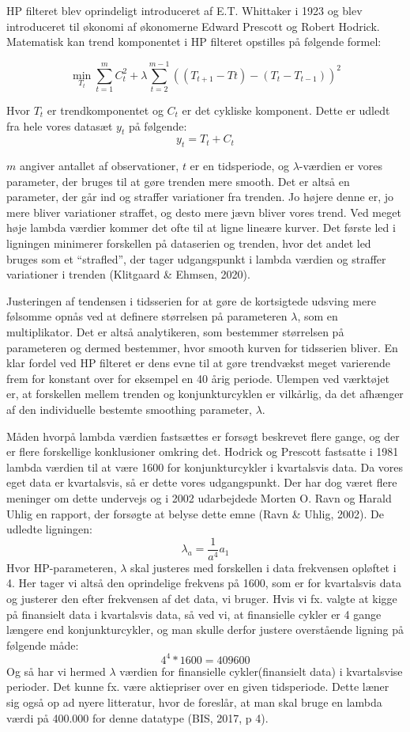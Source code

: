\documentclass[
  10pt,
]{article}
\begin{document}
HP filteret blev oprindeligt introduceret af E.T. Whittaker i 1923 og
blev introduceret til økonomi af økonomerne Edward Prescott og Robert
Hodrick. Matematisk kan trend komponentet i HP filteret opstilles på
følgende formel:

\[ \min_{T_t}\sum_{t=1}^m C_t^2+\lambda\sum_{t=2}^{m-1}((T_{t+1}-Tt)-(T_t-T_{t-1}))^2\]

Hvor \(T_t\) er trendkomponentet og \(C_t\) er det cykliske komponent.
Dette er udledt fra hele vores datasæt \(y_t\) på følgende:
\[ y_t=T_t+C_t\]

\(m\) angiver antallet af observationer, \(t\) er en tidsperiode, og
\(\lambda\)-værdien er vores parameter, der bruges til at gøre trenden
mere smooth. Det er altså en parameter, der går ind og straffer
variationer fra trenden. Jo højere denne er, jo mere bliver variationer
straffet, og desto mere jævn bliver vores trend. Ved meget høje lambda
værdier kommer det ofte til at ligne lineære kurver. Det første led i
ligningen minimerer forskellen på dataserien og trenden, hvor det andet
led bruges som et ``strafled'', der tager udgangspunkt i lambda værdien
og straffer variationer i trenden (Klitgaard \& Ehmsen, 2020).

Justeringen af tendensen i tidsserien for at gøre de kortsigtede udsving
mere følsomme opnås ved at definere størrelsen på parameteren
\(\lambda\), som en multiplikator. Det er altså analytikeren, som
bestemmer størrelsen på parameteren og dermed bestemmer, hvor smooth
kurven for tidsserien bliver. En klar fordel ved HP filteret er dens
evne til at gøre trendvækst meget varierende frem for konstant over for
eksempel en 40 årig periode. Ulempen ved værktøjet er, at forskellen
mellem trenden og konjunkturcyklen er vilkårlig, da det afhænger af den
individuelle bestemte smoothing parameter, \(\lambda\).

Måden hvorpå lambda værdien fastsættes er forsøgt beskrevet flere gange,
og der er flere forskellige konklusioner omkring det. Hodrick og
Prescott fastsatte i 1981 lambda værdien til at være 1600 for
konjunkturcykler i kvartalsvis data. Da vores eget data er kvartalsvis,
så er dette vores udgangspunkt. Der har dog været flere meninger om
dette undervejs og i 2002 udarbejdede Morten O. Ravn og Harald Uhlig en
rapport, der forsøgte at belyse dette emne (Ravn \& Uhlig, 2002). De
udledte ligningen: \[ \lambda_a=\frac{1}{a^4}a_1\] Hvor HP-parameteren,
\(\lambda\) skal justeres med forskellen i data frekvensen opløftet i 4.
Her tager vi altså den oprindelige frekvens på 1600, som er for
kvartalsvis data og justerer den efter frekvensen af det data, vi
bruger. Hvis vi fx. valgte at kigge på finansielt data i kvartalsvis
data, så ved vi, at finansielle cykler er 4 gange længere end
konjunkturcykler, og man skulle derfor justere overstående ligning på
følgende måde: \[ 4^4*1600 = 409600\] Og så har vi hermed \(\lambda\)
værdien for finansielle cykler(finansielt data) i kvartalsvise perioder.
Det kunne fx. være aktiepriser over en given tidsperiode. Dette læner
sig også op ad nyere litteratur, hvor de foreslår, at man skal bruge en
lambda værdi på 400.000 for denne datatype (BIS, 2017, p 4).
\end{document}
